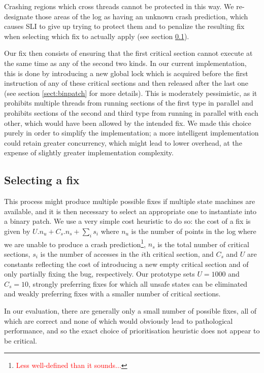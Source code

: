 \documentclass[10pt,twocolumn,preprint,natbib,authoryear]{sigplanconf}
\newcommand{\editorial}[1]{\textcolor{red}{\footnote{\textcolor{red}{#1}}}}
\begin{document}
Crashing regions which cross threads cannot be protected in this way.
We re-designate those areas of the log as having an unknown crash
prediction, which causes SLI to give up trying to protect them and to
penalize the resulting fix when selecting which fix to actually apply
(see section \ref{sect:selectfix}).

Our fix then consists of ensuring that the first critical section
cannot execute at the same time as any of the second two kinds.  In
our current implementation, this is done by introducing a new global
lock which is acquired before the first instruction of any of these
critical sections and then released after the last one (see section
\ref{sect:binpatch} for more details).  This is moderately
pessimistic, as it prohibits multiple threads from running sections of
the first type in parallel and prohibits sections of the second and
third type from running in parallel with each other, which would have
been allowed by the intended fix.  We made this choice purely in order
to simplify the implementation; a more intelligent implementation
could retain greater concurrency, which might lead to lower overhead,
at the expense of slightly greater implementation complexity.

\subsection{Selecting a fix}
\label{sect:selectfix}

This process might produce multiple possible fixes if multiple state
machines are available, and it is then necessary to select an
appropriate one to instantiate into a binary patch.  We use a very
simple cost heuristic to do so: the cost of a fix is given by $U.n_u +
C_s.n_s + {\sum_{i}}s_i$ where $n_u$ is the number of points in the
log where we are unable to produce a crash prediction\editorial{Less
  well-defined than it sounds...}, $n_s$ is the total number of
critical sections, $s_i$ is the number of accesses in the $i$th
critical section, and $C_s$ and $U$ are constants reflecting the cost
of introducing a new empty critical section and of only partially
fixing the bug, respectively.  Our prototype sets $U=1000$ and
$C_s=10$, strongly preferring fixes for which all unsafe states can be
eliminated and weakly preferring fixes with a smaller number of
critical sections.

In our evaluation, there are generally only a small number of possible
fixes, all of which are correct and none of which would obviously lead
to pathological performance, and so the exact choice of prioritisation
heuristic does not appear to be critical.
\end{document}
